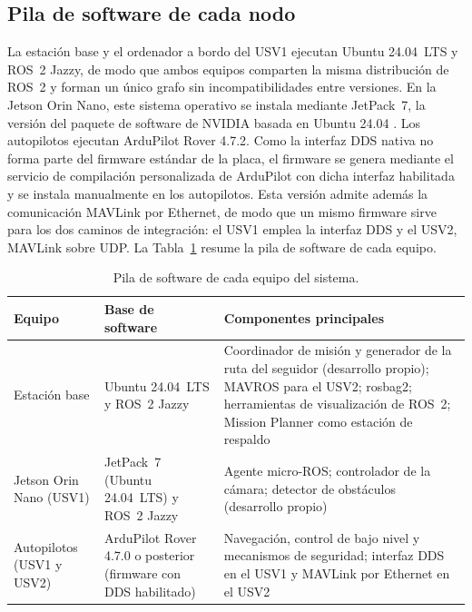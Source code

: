 \subsection{Pila de software de cada nodo}
\label{subsec:pila_software}
 
La estación base y el ordenador a bordo del USV1 ejecutan Ubuntu 24.04~LTS y ROS~2 Jazzy, de modo que ambos equipos 
comparten la misma distribución de ROS~2 y forman un único grafo sin incompatibilidades entre versiones. En la Jetson 
Orin Nano, este sistema operativo se instala mediante JetPack~7, la versión del paquete de software de NVIDIA basada en 
Ubuntu 24.04 \cite{jetpack7}. Los autopilotos ejecutan ArduPilot Rover 4.7.2. Como la interfaz DDS nativa no 
forma parte del firmware estándar de la placa, el firmware se genera mediante el servicio de compilación 
personalizada de ArduPilot con dicha interfaz habilitada y se instala manualmente en los autopilotos. 
Esta versión admite además la comunicación MAVLink por Ethernet, de modo que un mismo firmware sirve para 
los dos caminos de integración: el USV1 emplea la interfaz DDS y el USV2, MAVLink sobre UDP. La 
Tabla~\ref{tab:pila_software} resume la pila 
de software de cada equipo.

 
\begin{table}[!htb]
\centering
\caption{Pila de software de cada equipo del sistema.}
\label{tab:pila_software}
\footnotesize
\renewcommand{\arraystretch}{1.15}
\begin{tabularx}{\textwidth}{|>{\raggedright\arraybackslash}p{2.8cm}|>{\raggedright\arraybackslash}p{3.4cm}|>{\raggedright\arraybackslash}X|}
\hline
\textbf{Equipo} & \textbf{Base de software} & \textbf{Componentes principales} \\ \hline
Estación base & Ubuntu 24.04~LTS y ROS~2 Jazzy & Coordinador de misión y generador de la ruta del seguidor (desarrollo propio); MAVROS para el USV2; rosbag2; herramientas de visualización de ROS~2; Mission Planner como estación de respaldo \\ \hline
Jetson Orin Nano (USV1) & JetPack~7 (Ubuntu 24.04~LTS) y ROS~2 Jazzy & Agente micro-ROS; controlador de la cámara; detector de obstáculos (desarrollo propio) \\ \hline
Autopilotos (USV1 y USV2) & ArduPilot Rover 4.7.0 o posterior (firmware con DDS habilitado) & Navegación, control de bajo nivel y mecanismos de seguridad; interfaz DDS en el USV1 y MAVLink por Ethernet en el USV2 \\ \hline
\end{tabularx}
\end{table}
 
